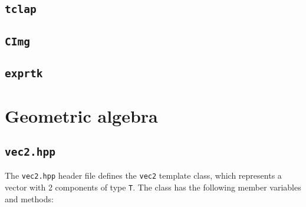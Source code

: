 \documentclass[a4paper,onecolumn,11pt]{doofus}
\begin{document}
\subsection{\texttt{tclap}}

\subsection{\texttt{CImg}}

\subsection{\texttt{exprtk}}

\section{Geometric algebra}


\subsection{\texttt{vec2.hpp}}

The \texttt{vec2.hpp} header file defines the \texttt{vec2} template class, which represents a vector with 2 components of type \texttt{T}. The class has the following member variables and methods:
\end{document}

